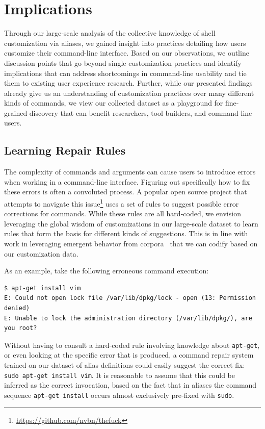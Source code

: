 \documentclass[smallextended,natbib]{svjour3}
\newcommand{\cmd}[1]{{\texttt{#1}}}
\begin{document}
\section{Implications}

Through our large-scale analysis of the collective knowledge of shell customization via aliases,
we gained insight into practices detailing how users customize their command-line interface.
Based on our observations, we outline discussion points that go beyond single customization practices and identify implications that can address shortcomings in command-line usability and tie them to existing user experience research.
Further, while our presented findings already give us an understanding of customization practices over many different kinds of commands, we view our collected dataset as a playground for fine-grained discovery that can benefit researchers, tool builders, and command-line users.

\subsection{Learning Repair Rules}
\label{sec:repair-rules}

The complexity of commands and arguments can cause users to introduce errors when working in a command-line interface.
Figuring out specifically how to fix these errors is often a convoluted process.
A popular open source project that attempts to navigate this issue\footnote{\url{https://github.com/nvbn/thefuck}} uses a set of rules to suggest possible error corrections for commands.
While these rules are all hard-coded, we envision leveraging the global wisdom of customizations in our large-scale dataset to learn rules that form the basis for different kinds of suggestions.
This is in line with work in leveraging emergent behavior from corpora~\citep{fast:14} that we can codify based on our customization data.

As an example, take the following erroneous command execution:
\begin{Verbatim}[breaklines=true]
$ apt-get install vim
E: Could not open lock file /var/lib/dpkg/lock - open (13: Permission denied)
E: Unable to lock the administration directory (/var/lib/dpkg/), are you root?
\end{Verbatim}
Without having to consult a hard-coded rule involving knowledge about \cmd{apt-get}, or even looking at the specific error that is produced, a command repair system trained on our dataset of alias definitions could easily suggest the correct fix: \texttt{sudo apt-get install vim}.
It is reasonable to assume that this could be inferred as the correct invocation, based on the fact that in aliases the command sequence \texttt{apt-get install} occurs almost exclusively pre-fixed with \cmd{sudo}.
\end{document}
